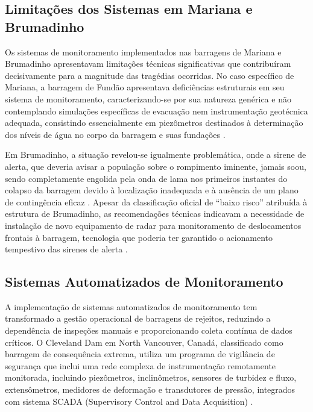 \subsection{Limitações dos Sistemas em Mariana e Brumadinho}

Os sistemas de monitoramento implementados nas barragens de Mariana e Brumadinho apresentavam limitações técnicas significativas que contribuíram decisivamente para a magnitude das tragédias ocorridas. No caso específico de Mariana, a barragem de Fundão apresentava deficiências estruturais em seu sistema de monitoramento, caracterizando-se por sua natureza genérica e não contemplando simulações específicas de evacuação nem instrumentação geotécnica adequada, consistindo essencialmente em piezômetros destinados à determinação dos níveis de água no corpo da barragem e suas fundações \cite{sequencia2024sismografico, geoscan2024sistema}.

Em Brumadinho, a situação revelou-se igualmente problemática, onde a sirene de alerta, que deveria avisar a população sobre o rompimento iminente, jamais soou, sendo completamente engolida pela onda de lama nos primeiros instantes do colapso da barragem devido à localização inadequada e à ausência de um plano de contingência eficaz \cite{taliberti2025tragedia}. Apesar da classificação oficial de ``baixo risco'' atribuída à estrutura de Brumadinho, as recomendações técnicas indicavam a necessidade de instalação de novo equipamento de radar para monitoramento de deslocamentos frontais à barragem, tecnologia que poderia ter garantido o acionamento tempestivo das sirenes de alerta \cite{metropoles2019laudos}.

\subsection{Sistemas Automatizados de Monitoramento}

A implementação de sistemas automatizados de monitoramento tem transformado a gestão operacional de barragens de rejeitos, reduzindo a dependência de inspeções manuais e proporcionando coleta contínua de dados críticos. O Cleveland Dam em North Vancouver, Canadá, classificado como barragem de consequência extrema, utiliza um programa de vigilância de segurança que inclui uma rede complexa de instrumentação remotamente monitorada, incluindo piezômetros, inclinômetros, sensores de turbidez e fluxo, extensômetros, medidores de deformação e transdutores de pressão, integrados com sistema SCADA (Supervisory Control and Data Acquisition) \cite{klohn2021surveillance}.


